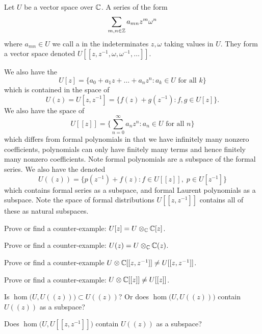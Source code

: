 \M
Let $U$ be a vector space over $\mathbb{C}$. A series of the form
\begin{equation}
\sum_{m,n\in\mathbb{Z}}a_{mn}z^{m}\omega^{n}
\end{equation}
where $a_{mn}\in U$ we call a  in the
indeterminates $z,\omega$ taking values in $U$. They form a vector space
denoted $U[[z,z^{-1},\omega,\omega^{-1},\dots]]$. 

We also have the 
\begin{equation}
U[z] = \{ a_{0}+a_{1}z+\dots+a_{n}z^{n} : a_{k}\in U\mbox{ for all }k\}
\end{equation}
which is contained in the space of 
\begin{equation}
U(z) = U[z,z^{-1}] = \{ f(z)+g(z^{-1}) : f,g\in U[z]\}.
\end{equation}
We also have the space of 
\begin{equation}
U[[z]] = \{\sum^{\infty}_{n=0}a_{n}z^{n} : a_{n}\in U\mbox{ for all }n\}
\end{equation}
which differs from formal polynomials in that we have infinitely many nonzero
coefficients, polynomials can only have finitely many terms and hence
finitely many nonzero coefficients. Note formal polynomials are a subspace
of the formal series. We also have the  denoted
\begin{equation}
U(\!(z)\!) = \{p(z^{-1})+f(z) : f\in U[[z]],\; p\in U[z^{-1}]\}
\end{equation}
which contains formal series as a subspace, and formal Laurent polynomials as a
subspace. Note the space of formal distributions $U[[z,z^{-1}]]$ contains all of
these as natural subspaces.

\begin{xca}
Prove or find a counter-example: $U[z]=U\otimes_{\mathbb{C}}\mathbb{C}[z]$.
\end{xca}
\begin{xca}
Prove or find a counter-example: $U(z)=U\otimes_{\mathbb{C}}\mathbb{C}(z)$. 
\end{xca}
\begin{xca}
Prove or find a counter-example $U\otimes\mathbb{C}[[z,z^{-1}]]\neq U[[z,z^{-1}]]$.
\end{xca}
\begin{xca}
Prove or find a counter-example: $U\otimes\mathbb{C}[[z]]\neq U[[z]]$.
\end{xca}
\begin{xca}
Is $\hom\bigl(U,U(\!(z)\!)\bigr)\subset U(\!(z)\!)$? Or does $\hom\bigl(U,U(\!(z)\!)\bigr)$ contain $U(\!(z)\!)$ as a subspace?
\end{xca}
\begin{xca}
Does $\hom\bigl(U,U[[z,z^{-1}]]\bigr)$ contain $U(\!(z)\!)$ as a subspace?
\end{xca}

